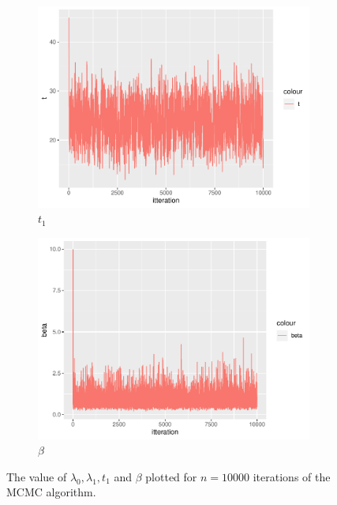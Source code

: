 \begin{figure}[h]
\begin{subfigure}[b]{0.49\textwidth}
        \includegraphics[width = \textwidth]{Images/sim_t.pdf}
        \caption{$t_1$}
        \label{fig:burnin_t}
    \end{subfigure}
    \begin{subfigure}[b]{0.49\textwidth}
        \centering
        \includegraphics[width = \textwidth]{Images/sim_beta.pdf}
        \caption{$\beta$}
        \label{fig:burnin_beta}
    \end{subfigure}
    \caption{The value of $\lambda_0, \lambda_1, t_1$ and $\beta$ plotted for $n = 10000$ iterations of the MCMC algorithm.}
    \label{fig:burnin_singleMH}
\end{figure}

